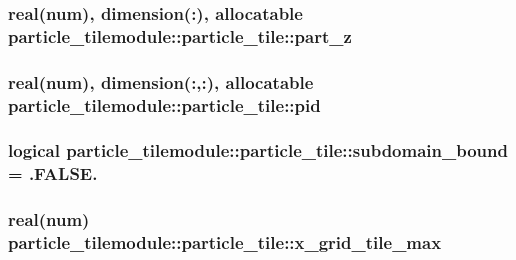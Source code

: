 \subsubsection[{\texorpdfstring{part\+\_\+z}{part_z}}]{\setlength{\rightskip}{0pt plus 5cm}real(num), dimension(\+:), allocatable particle\+\_\+tilemodule\+::particle\+\_\+tile\+::part\+\_\+z}\hypertarget{structparticle__tilemodule_1_1particle__tile_a8d89102d9a0d26ea7b4f201737bb6096}{}\label{structparticle__tilemodule_1_1particle__tile_a8d89102d9a0d26ea7b4f201737bb6096}
\subsubsection[{\texorpdfstring{pid}{pid}}]{\setlength{\rightskip}{0pt plus 5cm}real(num), dimension(\+:,\+:), allocatable particle\+\_\+tilemodule\+::particle\+\_\+tile\+::pid}\hypertarget{structparticle__tilemodule_1_1particle__tile_a6237c34ee3dedb0b664c5bc174ddc7e8}{}\label{structparticle__tilemodule_1_1particle__tile_a6237c34ee3dedb0b664c5bc174ddc7e8}
\subsubsection[{\texorpdfstring{subdomain\+\_\+bound}{subdomain_bound}}]{\setlength{\rightskip}{0pt plus 5cm}logical particle\+\_\+tilemodule\+::particle\+\_\+tile\+::subdomain\+\_\+bound = .F\+A\+L\+S\+E.}\hypertarget{structparticle__tilemodule_1_1particle__tile_afa855d68563f759241ff1ea974031d84}{}\label{structparticle__tilemodule_1_1particle__tile_afa855d68563f759241ff1ea974031d84}
\subsubsection[{\texorpdfstring{x\+\_\+grid\+\_\+tile\+\_\+max}{x_grid_tile_max}}]{\setlength{\rightskip}{0pt plus 5cm}real(num) particle\+\_\+tilemodule\+::particle\+\_\+tile\+::x\+\_\+grid\+\_\+tile\+\_\+max}\hypertarget{structparticle__tilemodule_1_1particle__tile_afa71688c8ff9a3c496122a637a222a18}{}\label{structparticle__tilemodule_1_1particle__tile_afa71688c8ff9a3c496122a637a222a18}
